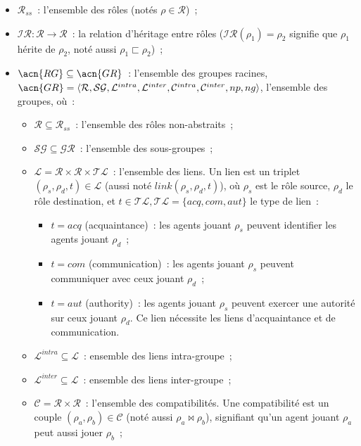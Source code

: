 \begin{itemize}
  \item $\mathcal{R}_{ss}$~: l'ensemble des rôles (notés $\rho \in \mathcal{R}$)~;
  \item $\mathcal{IR}: \mathcal{R} \rightarrow \mathcal{R}$~: la relation d'héritage entre rôles ($\mathcal{IR}(\rho_1) = \rho_2$ signifie que $\rho_1$ hérite de $\rho_2$, noté aussi $\rho_1 \sqsubset \rho_2$)~;
  \item $\acn{RG} \subseteq \acn{GR}$~: l'ensemble des groupes racines, $\acn{GR} = \langle \mathcal{R}, \mathcal{SG}, \mathcal{L}^{intra}, \mathcal{L}^{inter}, \mathcal{C}^{intra}, \mathcal{C}^{inter}, np, ng \rangle$, l'ensemble des groupes, où~:
        \begin{itemize}
          \item $\mathcal{R} \subseteq \mathcal{R}_{ss}$~: l'ensemble des rôles non-abstraits~;
          \item $\mathcal{SG} \subseteq \mathcal{GR}$~: l'ensemble des sous-groupes~;
          \item $\mathcal{L} = \mathcal{R} \times \mathcal{R} \times \mathcal{TL}$~: l'ensemble des liens. Un lien est un triplet $(\rho_s,\rho_d,t) \in \mathcal{L}$ (aussi noté $link(\rho_s,\rho_d,t)$), où $\rho_s$ est le rôle source, $\rho_d$ le rôle destination, et $t \in \mathcal{TL}, \mathcal{TL} = \{acq, com, aut\}$ le type de lien~:
                \begin{itemize}
                  \item $t = acq$ (acquaintance)~: les agents jouant $\rho_s$ peuvent identifier les agents jouant $\rho_d$~;
                  \item $t = com$ (communication)~: les agents jouant $\rho_s$ peuvent communiquer avec ceux jouant $\rho_d$~;
                  \item $t = aut$ (authority)~: les agents jouant $\rho_s$ peuvent exercer une autorité sur ceux jouant $\rho_d$. Ce lien nécessite les liens d'acquaintance et de communication.
                \end{itemize}
          \item $\mathcal{L}^{intra} \subseteq \mathcal{L}$~: ensemble des liens intra-groupe~;
          \item $\mathcal{L}^{inter} \subseteq \mathcal{L}$~: ensemble des liens inter-groupe~;
          \item $\mathcal{C} = \mathcal{R} \times \mathcal{R}$~: l'ensemble des compatibilités. Une compatibilité est un couple $(\rho_a, \rho_b) \in \mathcal{C}$ (noté aussi $\rho_a \bowtie \rho_b$), signifiant qu'un agent jouant $\rho_a$ peut aussi jouer $\rho_b$~;

\end{itemize}
\end{itemize}
